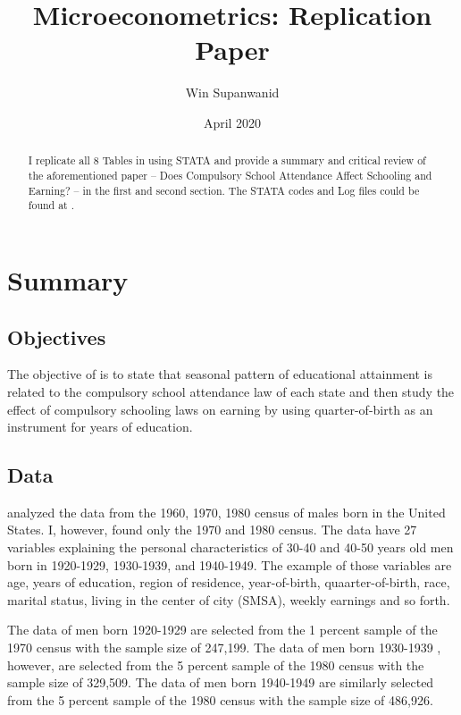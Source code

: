 \documentclass{article}
\title{Microeconometrics:  Replication Paper}
\author{Win Supanwanid}
\date{April 2020}
\begin{document}
\renewcommand{\abstractname}{\vspace{-\baselineskip}} %
\maketitle

\begin{abstract}

I replicate all 8 Tables in \cite{angrist1991} using STATA and provide a summary and critical review of the aforementioned paper -- Does Compulsory School Attendance Affect Schooling and Earning? --
in the first and second section. The STATA codes and Log files could be found at .

\end{abstract}


\section{Summary}

\subsection{Objectives}

The objective of \cite{angrist1991} is to state that seasonal pattern of educational attainment is related to the compulsory school attendance law of each state
and then study the effect of compulsory schooling laws on earning by using quarter-of-birth as an instrument for years of education.



\subsection{Data}

 \cite{angrist1991} analyzed the data from the 1960, 1970, 1980 census of males born in the United States. I, however, found only the 1970 and 1980 census. 
The data have 27 variables explaining the personal characteristics of 30-40 and 40-50 years old men born in 1920-1929, 1930-1939, and 1940-1949. The example of those variables are age, years of education, region of residence, year-of-birth, quaarter-of-birth, race, marital status, living in the center of city (SMSA), weekly earnings and so forth.

The data of men born 1920-1929 are selected from the 1 percent sample of the 1970 census with the sample size of 247,199. The data of men born 1930-1939 , however, are selected from the 5 percent sample of the 1980 census with the sample size of 329,509. The data of men born 1940-1949 are similarly selected from the 5 percent sample of the 1980 census with the sample size of 486,926.
\end{document}
